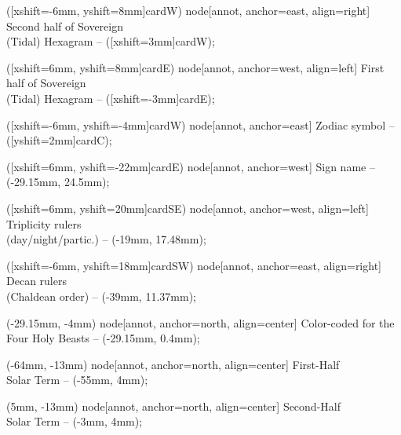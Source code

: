 \documentclass{article}
\begin{document}
\begin{center}
{  %
    ([xshift=-6mm, yshift=8mm]cardW) node[annot, anchor=east, align=right] {Second half of Sovereign\\(Tidal) Hexagram}
    -- ([xshift=3mm]cardW);

    ([xshift=6mm, yshift=8mm]cardE) node[annot, anchor=west, align=left] {First half of Sovereign\\(Tidal) Hexagram}
    -- ([xshift=-3mm]cardE);

    ([xshift=-6mm, yshift=-4mm]cardW) node[annot, anchor=east] {Zodiac symbol}
    -- ([yshift=2mm]cardC);

    ([xshift=6mm, yshift=-22mm]cardE) node[annot, anchor=west] {Sign name}
    -- (-29.15mm, 24.5mm);

    ([xshift=6mm, yshift=20mm]cardSE) node[annot, anchor=west, align=left] {Triplicity rulers\\(day/night/partic.)}
    -- (-19mm, 17.48mm);

    ([xshift=-6mm, yshift=18mm]cardSW) node[annot, anchor=east, align=right] {Decan rulers\\(Chaldean order)}
    -- (-39mm, 11.37mm);

    (-29.15mm, -4mm) node[annot, anchor=north, align=center] {Color-coded for the Four Holy Beasts}
    -- (-29.15mm, 0.4mm);

    (-64mm, -13mm) node[annot, anchor=north, align=center] {First-Half\\Solar Term}
    -- (-55mm, 4mm);

    (5mm, -13mm) node[annot, anchor=north, align=center] {Second-Half\\Solar Term}
    -- (-3mm, 4mm);
}
\end{center}
\end{document}
